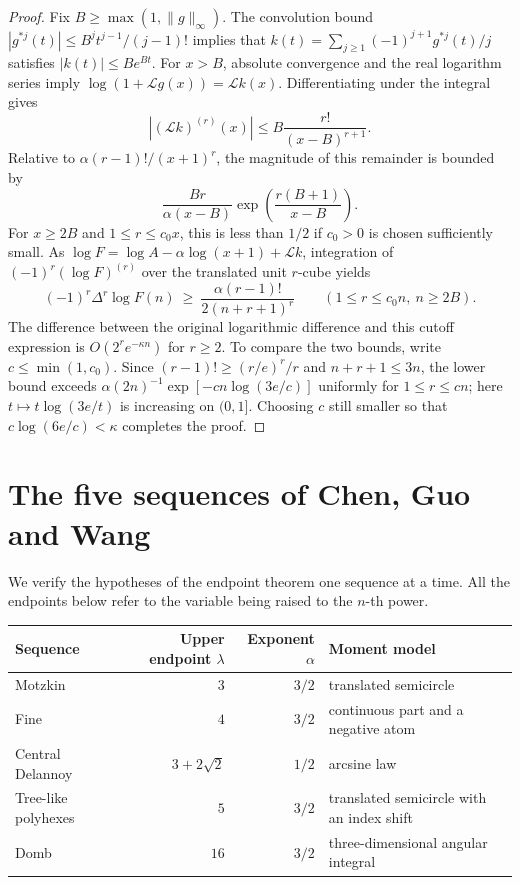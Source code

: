\documentclass[11pt,a4paper]{article}
\begin{document}
\begin{proof}
Fix $B\ge\max(1,\|g\|_\infty)$. The convolution bound $|g^{*j}(t)|\le B^j t^{j-1}/(j-1)!$ implies that
$k(t)=\sum_{j\ge1}(-1)^{j+1}g^{*j}(t)/j$ satisfies $|k(t)|\le B e^{Bt}$. For $x>B$, absolute convergence and the real logarithm series imply
$\log(1+\mathcal Lg(x))=\mathcal Lk(x)$. Differentiating under the integral gives
\[
 |(\mathcal Lk)^{(r)}(x)|\le B\frac{r!}{(x-B)^{r+1}}.
\]
Relative to $\alpha(r-1)!/(x+1)^r$, the magnitude of this remainder is bounded by
\[
 \frac{Br}{\alpha(x-B)}
 \exp\!\left(\frac{r(B+1)}{x-B}\right).
\]
For $x\ge 2B$ and $1\le r\le c_0 x$, this is less than $1/2$ if $c_0>0$ is chosen sufficiently small. As $\log F=\log A-\alpha\log(x+1)+\mathcal Lk$, integration of $(-1)^r(\log F)^{(r)}$ over the translated unit $r$-cube yields
\[
 (-1)^r \Delta^r\log F(n)\ \ge\ \frac{\alpha(r-1)!}{2(n+r+1)^r}
 \qquad(1\le r\le c_0 n,\ n\ge 2B).
\]
The difference between the original logarithmic difference and this cutoff expression is $O(2^r e^{-\kappa n})$ for $r\ge 2$. To compare the two bounds, write $c\le\min(1,c_0)$. Since $(r-1)!\ge (r/e)^r/r$ and $n+r+1\le 3n$, the lower bound exceeds $\alpha(2n)^{-1}\exp[-cn\log(3e/c)]$ uniformly for $1\le r\le cn$; here $t\mapsto t\log(3e/t)$ is increasing on $(0,1]$. Choosing $c$ still smaller so that $c\log(6e/c)<\kappa$ completes the proof.\end{proof}
\section{The five sequences of Chen, Guo and Wang}\label{sec:five}
We verify the hypotheses of the endpoint theorem one sequence at a time.
All the endpoints below refer to the variable being raised to the $n$-th power.
\begin{center}
\small\begin{tabular}{@{}lrrl@{}}
\toprule
Sequence & Upper endpoint $\lambda$ & Exponent $\alpha$ & Moment model\\
\midrule
Motzkin & $3$ & $3/2$ & translated semicircle\\
Fine & $4$ & $3/2$ & continuous part and a negative atom\\
Central Delannoy & $3+2\sqrt2$ & $1/2$ & arcsine law\\
Tree-like polyhexes & $5$ & $3/2$ & translated semicircle with an index shift\\
Domb & $16$ & $3/2$ & three-dimensional angular integral\\
\bottomrule
\end{tabular}
\end{center}
\end{document}
